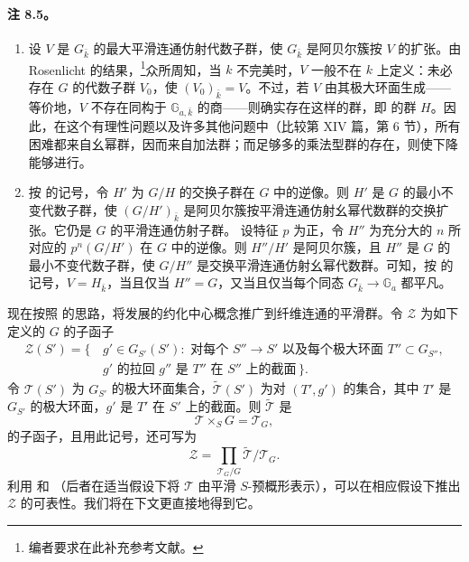 \paragraph{\textbf{注 8.5。}}
\begin{enumerate}
\item[\emph{\SGAInlineRefTarget{sga3:xii:8.5:item:a}(a)}] 设 \(V\) 是 \(G_{\bar k}\) 的最大平滑连通仿射代数子群，使 \(G_{\bar k}\) 是阿贝尔簇按 \(V\) 的扩张。由 Rosenlicht 的结果，\footnote{编者要求在此补充参考文献。}众所周知，当 \(k\) 不完美时，\(V\) 一般不在 \(k\) 上定义：未必存在 \(G\) 的代数子群 \(V_0\)，使 \((V_0)_{\bar k}=V\)。不过，若 \(V\) 由其极大环面生成——等价地，\(V\) 不存在同构于 \(\mathbb G_{a,\bar k}\) 的商——则确实存在这样的群，即  的群 \(H\)。因此，在这个有理性问题以及许多其他问题中（比较第 XIV 篇，第 6 节），所有困难都来自幺幂群，因而来自加法群；而足够多的乘法型群的存在，则使下降能够进行。
\item[\emph{(b)}] 按  的记号，令 \(H'\) 为 \(G/H\) 的交换子群在 \(G\) 中的逆像。则 \(H'\) 是 \(G\) 的最小不变代数子群，使 \((G/H')_{\bar k}\) 是阿贝尔簇按平滑连通仿射幺幂代数群的交换扩张。它仍是 \(G\) 的平滑连通仿射子群。
设特征 \(p\) 为正，令 \(H''\) 为充分大的 \(n\) 所对应的 \(p^n(G/H')\) 在 \(G\) 中的逆像。则 \(H''/H'\) 是阿贝尔簇，且 \(H''\) 是 \(G\) 的最小不变代数子群，使 \(G/H''\) 是交换平滑连通仿射幺幂代数群。可知，按\textup{} 的记号，\(V=H_{\bar k}\)，当且仅当 \(H''=G\)，又当且仅当每个同态 \(G_{\bar k}\to\mathbb G_a\) 都平凡。
\end{enumerate}
现在按照  的思路，将发展的约化中心概念推广到纤维连通的平滑群。令 \(\mathcal Z\) 为如下定义的 \(G\) 的子函子
\[
\begin{split}
  \mathcal Z(S')=\{\, &g'\in G_{S'}(S'):\text{ 对每个 }
  S''\to S'\text{ 以及每个极大环面 }T''\subset G_{S''},\\
  &g'\text{ 的拉回 }g''\text{ 是 }
  T''\text{ 在 }S''\text{ 上的截面}\,\}.
\end{split}
\]
令 \(\mathcal T(S')\) 为 \(G_{S'}\) 的极大环面集合，\(\widetilde{\mathcal T}(S')\) 为对 \((T',g')\) 的集合，其中 \(T'\) 是 \(G_{S'}\) 的极大环面，\(g'\) 是 \(T'\) 在 \(S'\) 上的截面。则 \(\widetilde{\mathcal T}\) 是
\[
  \mathcal T\times_S G=\mathcal T_G,
\]
的子函子，且用此记号，还可写为
\[
  \mathcal Z=
  \prod_{\mathcal T_G/G}
  \widetilde{\mathcal T}/\mathcal T_G.
\]
利用  和 （后者在适当假设下将 \(\mathcal T\) 由平滑 \(S\)-预概形表示），可以在相应假设下推出 \(\mathcal Z\) 的可表性。我们将在下文更直接地得到它。
